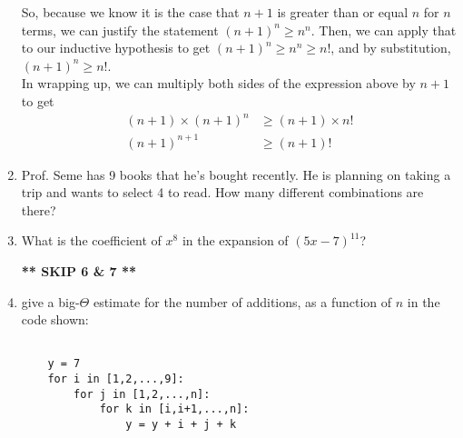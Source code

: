 \documentclass[10pt]{article}
\newenvironment{solution}{\textit{Solution}.}
\newcommand{\solex}[1]{
    \vspace{5pt}
    \begin{solution}
    #1
    \end{solution}
}
\begin{document}
\begin{enumerate}
{\begin{itemize}
                        So, because we know it is the case that $n + 1$ is greater than or equal $n$ for $n$ terms, we can justify the statement $(n + 1)^n \geq n^n$. Then, we can apply that to our inductive hypothesis to get $(n + 1)^n \geq n^n \geq n!$, and by substitution, $(n + 1)^n \geq n!$. \\

                        In wrapping up, we can multiply both sides of the expression above by $n + 1$ to get
                        \begin{align*}
                            (n + 1) \times (n + 1)^n & \geq (n + 1) \times n! \\
                            (n + 1)^{n+1}            & \geq (n + 1)!
                        \end{align*}
              \end{itemize}
          }
    \item Prof. Seme has 9 books that he's bought recently. He is planning on taking a trip and wants to select 4 to read. How many different combinations are there? \\


    \item What is the coefficient of $x^8$ in the expansion of $(5x - 7)^{11}$? \\


          \begin{center}
              \textbf{** SKIP 6 \& 7 **}
          \end{center}


          \setcounter{enumi}{7}

    \item give a big-$\Theta$ estimate for the number of additions, as a function of $n$ in the code shown: \\

          \begin{lstlisting}
    
    y = 7
    for i in [1,2,...,9]:
        for j in [1,2,...,n]:
            for k in [i,i+1,...,n]:
                y = y + i + j + k
    \end{lstlisting}


\end{enumerate}
\end{document}
